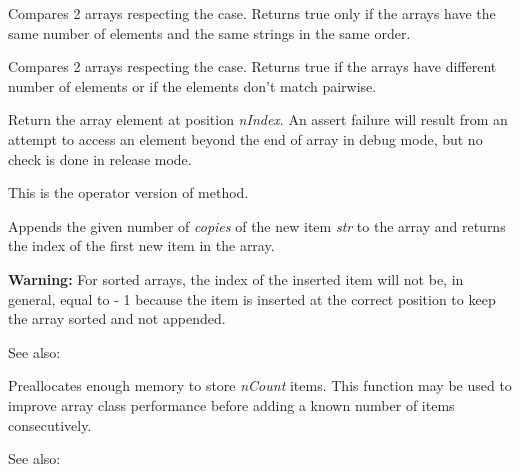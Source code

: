 Compares 2 arrays respecting the case. Returns true only if the arrays have
the same number of elements and the same strings in the same order.

\label{wxarraystringoperatornotequal}


Compares 2 arrays respecting the case. Returns true if the arrays have
different number of elements or if the elements don't match pairwise.

\label{wxarraystringoperatorindex}


Return the array element at position {\it nIndex}. An assert failure will
result from an attempt to access an element beyond the end of array in debug
mode, but no check is done in release mode.

This is the operator version of  method.

\label{wxarraystringadd}


Appends the given number of {\it copies} of the new item {\it str} to the
array and returns the index of the first new item in the array.

{\bf Warning:} For sorted arrays, the index of the inserted item will not be,
in general, equal to  - 1 because
the item is inserted at the correct position to keep the array sorted and not
appended.

See also: 

\label{wxarraystringalloc}


Preallocates enough memory to store {\it nCount} items. This function may be
used to improve array class performance before adding a known number of items
consecutively.

See also: 

\label{wxarraystringclear}


